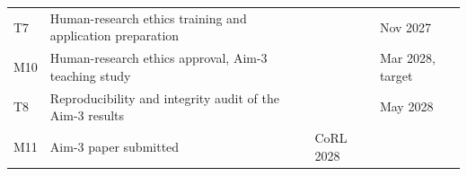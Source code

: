 \documentclass[
  11pt,
]{article}
\begin{document}
\begin{longtable}[]{@{}llll@{}}
\begin{minipage}[t]{0.06\columnwidth}\raggedright
T7\strut
\end{minipage} & \begin{minipage}[t]{0.49\columnwidth}\raggedright
Human-research ethics training and application preparation\strut
\end{minipage} & \begin{minipage}[t]{0.19\columnwidth}\raggedright
\strut
\end{minipage} & \begin{minipage}[t]{0.15\columnwidth}\raggedright
Nov 2027\strut
\end{minipage}\tabularnewline
\begin{minipage}[t]{0.06\columnwidth}\raggedright
M10\strut
\end{minipage} & \begin{minipage}[t]{0.49\columnwidth}\raggedright
Human-research ethics approval, Aim-3 teaching study\strut
\end{minipage} & \begin{minipage}[t]{0.19\columnwidth}\raggedright
\strut
\end{minipage} & \begin{minipage}[t]{0.15\columnwidth}\raggedright
Mar 2028, target\strut
\end{minipage}\tabularnewline
\begin{minipage}[t]{0.06\columnwidth}\raggedright
T8\strut
\end{minipage} & \begin{minipage}[t]{0.49\columnwidth}\raggedright
Reproducibility and integrity audit of the Aim-3 results\strut
\end{minipage} & \begin{minipage}[t]{0.19\columnwidth}\raggedright
\strut
\end{minipage} & \begin{minipage}[t]{0.15\columnwidth}\raggedright
May 2028\strut
\end{minipage}\tabularnewline
\begin{minipage}[t]{0.06\columnwidth}\raggedright
M11\strut
\end{minipage} & \begin{minipage}[t]{0.49\columnwidth}\raggedright
Aim-3 paper submitted\strut
\end{minipage} & \begin{minipage}[t]{0.19\columnwidth}\raggedright
CoRL 2028\strut
\end{minipage} & \begin{minipage}[t]{0.15\columnwidth}\raggedright

\end{minipage}
\end{longtable}
\end{document}
